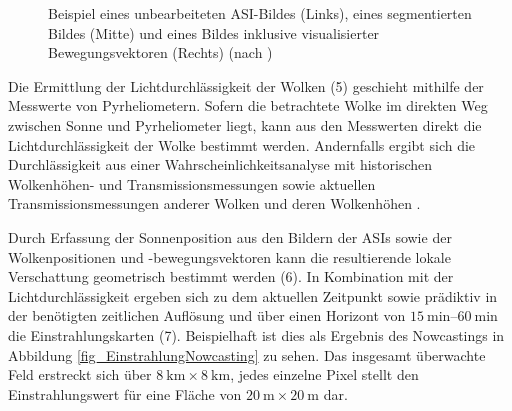 \begin{figure}[h!]
\centering
\setlength{\fboxsep}{1pt}
\setlength{\fboxrule}{1pt}
\caption[Beispiel eines unbearbeiteten ASI-Bildes, eines segmentierten Bildes und eines Bildes inklusive visualisierter Bewegungsvektoren]{Beispiel eines unbearbeiteten ASI-Bildes (Links), eines segmentierten Bildes (Mitte) und eines Bildes inklusive visualisierter Bewegungsvektoren (Rechts) (nach \cite[S.8]{Sayeef})}
\label{fig_Nowcasting}
\end{figure}

Die Ermittlung der Lichtdurchlässigkeit der Wolken (5) geschieht mithilfe der Messwerte von Pyrheliometern.
Sofern die betrachtete Wolke im direkten Weg zwischen Sonne und Pyrheliometer liegt, kann aus den Messwerten direkt die Lichtdurchlässigkeit der Wolke bestimmt werden.
Andernfalls ergibt sich die Durchlässigkeit aus einer Wahrscheinlichkeitsanalyse mit historischen Wolkenhöhen- und Transmissionsmessungen sowie aktuellen Transmissionsmessungen anderer Wolken und deren Wolkenhöhen \cite{BijanNowcasting}.

Durch Erfassung der Sonnenposition aus den Bildern der ASIs sowie der Wolkenpositionen und -bewegungsvektoren kann die resultierende lokale Verschattung geometrisch bestimmt werden (6).
In Kombination mit der Lichtdurchlässigkeit ergeben sich zu dem aktuellen Zeitpunkt sowie prädiktiv in der benötigten zeitlichen Auflösung und über einen Horizont von $\SIrange{15}{60}{\minute}$ die Einstrahlungskarten (7).
Beispielhaft ist dies als Ergebnis des Nowcastings in Abbildung \ref{fig_EinstrahlungNowcasting} zu sehen.
Das insgesamt überwachte Feld erstreckt sich über $\SI{8}{\kilo\metre} \times \SI{8}{\kilo\metre}$, jedes einzelne Pixel stellt den Einstrahlungswert für eine Fläche von $\SI{20}{\metre} \times \SI{20}{\metre}$ dar. \cite[S.14]{Samu}

